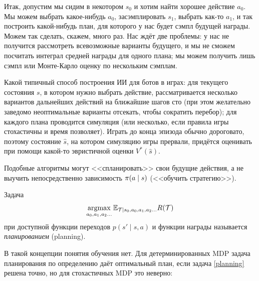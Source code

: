Итак, допустим мы сидим в некотором $s_0$ и хотим найти хорошее действие $a_0$. Мы можем выбрать какое-нибудь $a_0$, засэмплировать $s_1$, выбрать как-то $a_1$, и так построить какой-нибудь план, для которого у нас будет сэмпл будущей награды. Можем так сделать, скажем, много раз. Нас ждёт две проблемы: у нас не получится рассмотреть всевозможные варианты будущего, и мы не сможем посчитать интеграл средней награды для одного плана; мы можем получить лишь сэмпл или Монте-Карло оценку по нескольким сэмплам.

\begin{example}
Какой типичный способ построения ИИ для ботов в играх: для текущего состояния $s$, в котором нужно выбрать действие, рассматривается несколько вариантов дальнейших действий на ближайшие шагов сто (при этом желательно заведомо неоптимальные варианты отсекать, чтобы сократить перебор); для каждого плана проводится симуляция (или несколько, если правила игры стохастичны и время позволяет). Играть до конца эпизода обычно дороговато, поэтому состояние $\hat{s}$, на котором симуляцию игры прервали, придётся оценивать при помощи какой-то эвристичной оценки $V^*(\hat{s})$.
\end{example}

Подобные алгоритмы могут <<спланировать>> свои будущие действия, а не выучить непосредственно зависимость $\pi(a \HM\mid s)$ (<<обучить стратегию>>).

\begin{definition}
Задача
\begin{equation}\label{planning}
\mathop{\mathrm{argmax}}_{a_0, a_1, a_2 \dots} \mathbb{E}_{\mathcal{T} \mid s_0, a_0, a_1, a_2 \dots} R(\mathcal{T})
\end{equation}
при доступной функции переходов $p(s' \mid s, a)$ и функции награды называется \emph{планированием} (planning).
\end{definition}

В такой концепции понятия обучения нет. Для детерминированных MDP задача планирования по определению даёт оптимальный план, если задача \eqref{planning} решена точно, но для стохастичных MDP это неверно: 

